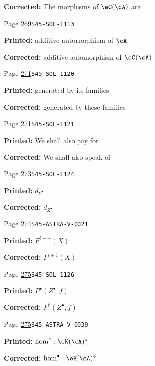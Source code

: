 \begin{description}
\par\noindent\textbf{Corrected:} The morphisms of $\eC(\cA)$ are
\smallskip
\item[\hypertarget{apparatus:EN-0194}{194}] Page \hyperlink{printpage:en:269}{269}\quad\texttt{S45-SOL-1113}
\par\noindent\textbf{Printed:} additive automorphism of $\cA$
\par\noindent\textbf{Corrected:} additive automorphism of $\eC(\cA)$
\smallskip
\item[\hypertarget{apparatus:EN-0195}{195}] Page \hyperlink{printpage:en:271}{271}\quad\texttt{S45-SOL-1120}
\par\noindent\textbf{Printed:} generated
    by its families
\par\noindent\textbf{Corrected:} generated
    by these families
\smallskip
\item[\hypertarget{apparatus:EN-0196}{196}] Page \hyperlink{printpage:en:271}{271}\quad\texttt{S45-SOL-1121}
\par\noindent\textbf{Printed:} We shall also pay for
\par\noindent\textbf{Corrected:} We shall also speak of
\smallskip
\item[\hypertarget{apparatus:EN-0197}{197}] Page \hyperlink{printpage:en:273}{273}\quad\texttt{S45-SOL-1124}
\par\noindent\textbf{Printed:} \(d_{Y^\bullet}\)
\par\noindent\textbf{Corrected:} \(d_{Z^\bullet}\)
\smallskip
\item[\hypertarget{apparatus:EN-0198}{198}] Page \hyperlink{printpage:en:274}{274}\quad\texttt{S45-ASTRA-V-0021}
\par\noindent\textbf{Printed:} \(F^{i+-}(X)\)
\par\noindent\textbf{Corrected:} \(F^{i+1}(X)\)
\smallskip
\item[\hypertarget{apparatus:EN-0199}{199}] Page \hyperlink{printpage:en:275}{275}\quad\texttt{S45-SOL-1126}
\par\noindent\textbf{Printed:} \(P^\bullet(Z^\bullet,f)\)
\par\noindent\textbf{Corrected:} \(P^\ast(Z^\bullet,f)\)
\smallskip
\item[\hypertarget{apparatus:EN-0200}{200}] Page \hyperlink{printpage:en:275}{275}\quad\texttt{S45-ASTRA-V-0039}
\par\noindent\textbf{Printed:} \(\hom^\circ:\eK(\cA)^\circ\)
\par\noindent\textbf{Corrected:} \(\hom^\bullet:\eK(\cA)^\circ\)
\smallskip

\end{description}
